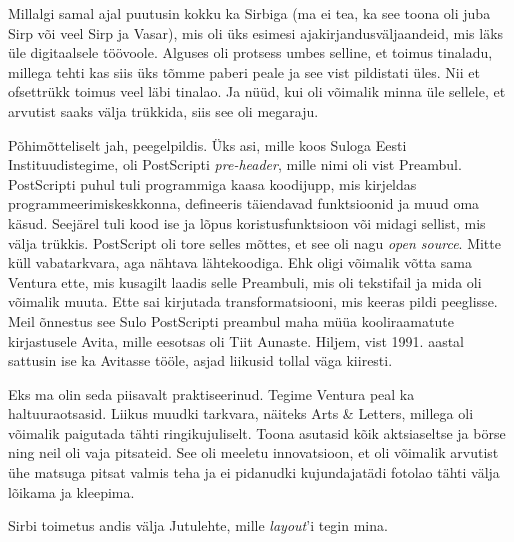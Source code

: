 Millalgi samal ajal puutusin kokku ka Sirbiga (ma ei tea, ka 
see toona oli juba Sirp või veel Sirp ja Vasar), mis oli üks esimesi 
ajakirjandusväljaandeid, mis läks üle digitaalsele töövoole. Alguses oli protsess umbes 
selline, et toimus tinaladu, millega tehti kas siis üks tõmme paberi peale ja 
see vist pildistati üles. Nii et ofsettrükk toimus 
veel läbi tinalao. Ja nüüd, kui oli võimalik minna üle sellele, et arvutist 
saaks välja trükkida, siis see oli megaraju.


Põhimõtteliselt jah, peegelpildis. Üks asi, mille koos 
Suloga Eesti 
Instituudistegime, oli PostScripti \emph{pre-header}, mille nimi oli vist Preambul. 
PostScripti puhul tuli programmiga kaasa 
koodijupp, mis kirjeldas programmeerimiskeskkonna, defineeris 
täiendavad funktsioonid ja muud oma käsud. Seejärel tuli kood ise ja lõpus 
koristusfunktsioon või midagi sellist, mis välja trükkis. PostScript oli tore selles 
mõttes, et see oli nagu \emph{open source}. Mitte küll vabatarkvara, aga 
nähtava lähtekoodiga. Ehk oligi võimalik võtta sama Ventura ette, 
mis kusagilt laadis selle Preambuli, mis oli tekstifail ja mida oli võimalik 
muuta. Ette sai kirjutada transformatsiooni, mis 
keeras pildi peeglisse. Meil õnnestus see Sulo PostScripti preambul maha müüa kooliraamatute kirjastusele
Avita, mille eesotsas oli Tiit Aunaste. Hiljem, vist 1991. aastal sattusin ise ka Avitasse tööle, asjad liikusid tollal
väga kiiresti.


Eks ma olin seda piisavalt praktiseerinud. Tegime Ventura peal ka 
haltuuraotsasid. Liikus muudki tarkvara, näiteks Arts \& Letters, millega oli võimalik paigutada tähti ringikujuliselt. 
Toona asutasid kõik aktsiaseltse ja börse ning 
neil oli vaja pitsateid. See oli meeletu innovatsioon, et oli võimalik 
arvutist ühe matsuga pitsat valmis teha ja ei pidanudki 
kujundajatädi fotolao tähti välja lõikama ja kleepima. 

Sirbi toimetus andis välja Jutulehte, mille \emph{layout}'i tegin mina. 

